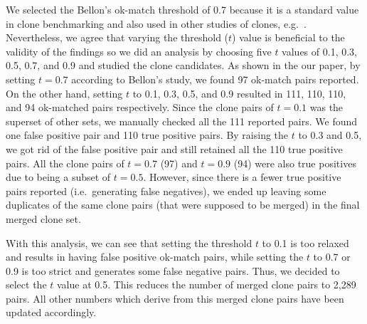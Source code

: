 \documentclass[a4paper,twoside,10pt]{reviewresponse}
\begin{document}
We selected the Bellon's ok-match threshold of 0.7 because it is a standard value in clone benchmarking \citep{Bellon2007} and also used in other studies of clones, e.g.~\cite{Sajnani2016}. Nevertheless, we agree that varying the threshold ($t$) value is beneficial to the validity of the findings so we did an analysis by choosing five $t$ values of 0.1, 0.3, 0.5, 0.7, and 0.9 and studied the clone candidates. As shown in the our paper, by setting $t=0.7$ according to Bellon's study, we found 97 ok-match pairs reported. On the other hand, setting $t$ to 0.1, 0.3, 0.5, and 0.9 resulted in 111, 110, 110, and 94 ok-matched pairs respectively.
Since the clone pairs of $t=0.1$ was the superset of other sets,  we manually checked all the 111 reported pairs.
We found one false positive pair and 110 true positive pairs. By raising the $t$ to 0.3 and 0.5, we got rid of the false positive pair and still retained all the 110 true positive pairs. All the clone pairs of $t=0.7$ (97) and $t=0.9$ (94) were also true positives due to being a subset of $t=0.5$. However, since there is a fewer true positive pairs reported (i.e.~generating false negatives), we ended up leaving some duplicates of the same clone pairs (that were supposed to be merged) in the final merged clone set.

With this analysis, we can see that setting the threshold $t$ to 0.1 is too relaxed and results in having false positive ok-match pairs, while setting the $t$ to 0.7 or 0.9 is too strict and generates some false negative pairs. Thus, we decided to select the $t$ value at 0.5. This reduces the number of merged clone pairs to 2,289 pairs. All other numbers which derive from this merged clone pairs have been updated accordingly.

\end{document}
